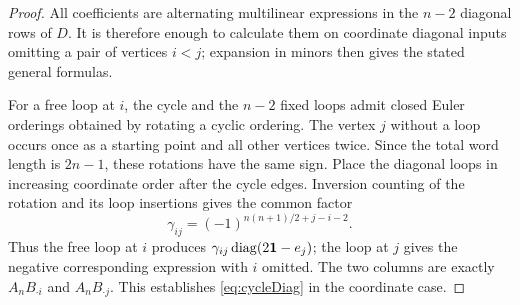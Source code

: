 \begin{proof}
All coefficients are alternating multilinear expressions in the
$n-2$ diagonal rows of $D$. It is therefore enough to calculate them
on coordinate diagonal inputs omitting a pair of vertices $i<j$;
expansion in minors then gives the stated general formulas.

For a free loop at $i$, the cycle and the $n-2$ fixed loops admit
closed Euler orderings obtained by rotating a cyclic ordering.
The vertex $j$ without a loop occurs once as a starting point and
all other vertices twice. Since the total word length is $2n-1$,
these rotations have the same sign. Place the diagonal loops in
increasing coordinate order after the cycle edges. Inversion
counting of the rotation and its loop insertions gives the common
factor
\[
 \gamma_{ij}=(-1)^{n(n+1)/2+j-i-2}.
\]
Thus the free loop at $i$ produces
$\gamma_{ij}\operatorname{diag}(2\mathbf{1}-e_j)$; the loop at $j$ gives the
negative corresponding expression with $i$ omitted. The two
columns are exactly $A_nB_{\cdot i}$ and $A_nB_{\cdot j}$.
This establishes \eqref{eq:cycleDiag} in the coordinate case.


\end{proof}
